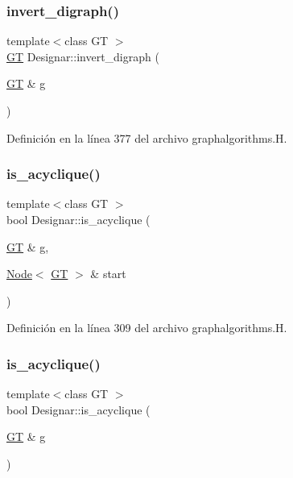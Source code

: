 \subsubsection{\texorpdfstring{invert\+\_\+digraph()}{invert\_digraph()}\hspace{0.1cm}{\footnotesize\ttfamily [2/2]}}
{\footnotesize\ttfamily template$<$class GT $>$ \\
\hyperlink{demo-buildgraph_8_c_a3001c40d2c31ca87ed96cd7d1334a55e}{GT} Designar\+::invert\+\_\+digraph (\begin{DoxyParamCaption}\item[{\hyperlink{demo-buildgraph_8_c_a3001c40d2c31ca87ed96cd7d1334a55e}{GT} \&}]{g }\end{DoxyParamCaption})}



Definición en la línea 377 del archivo graphalgorithms.\+H.

\mbox{\label{namespace_designar_a2312b1c69641afff1ae507474ddae644}} 
\subsubsection{\texorpdfstring{is\+\_\+acyclique()}{is\_acyclique()}\hspace{0.1cm}{\footnotesize\ttfamily [1/2]}}
{\footnotesize\ttfamily template$<$class GT $>$ \\
bool Designar\+::is\+\_\+acyclique (\begin{DoxyParamCaption}\item[{\hyperlink{demo-buildgraph_8_c_a3001c40d2c31ca87ed96cd7d1334a55e}{GT} \&}]{g,  }\item[{\hyperlink{namespace_designar_a5af326c65aa2bd26b26c410f2030d09e}{Node}$<$ \hyperlink{demo-buildgraph_8_c_a3001c40d2c31ca87ed96cd7d1334a55e}{GT} $>$ \&}]{start }\end{DoxyParamCaption})}



Definición en la línea 309 del archivo graphalgorithms.\+H.

\mbox{\label{namespace_designar_a961b99a3831c3c5d64c364f8cb2abc9f}} 
\subsubsection{\texorpdfstring{is\+\_\+acyclique()}{is\_acyclique()}\hspace{0.1cm}{\footnotesize\ttfamily [2/2]}}
{\footnotesize\ttfamily template$<$class GT $>$ \\
bool Designar\+::is\+\_\+acyclique (\begin{DoxyParamCaption}\item[{\hyperlink{demo-buildgraph_8_c_a3001c40d2c31ca87ed96cd7d1334a55e}{GT} \&}]{g }\end{DoxyParamCaption})}



